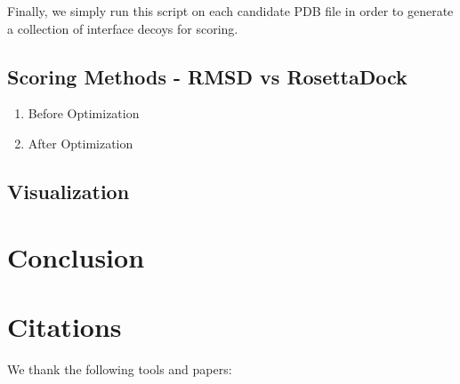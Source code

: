 \documentclass{article}
\begin{document}
Finally, we simply run this script on each candidate PDB file in order to generate a collection of interface decoys for scoring.


\subsection{Scoring Methods - RMSD vs RosettaDock}

\begin{enumerate}

\item Before Optimization



\item After Optimization



\end{enumerate}

\subsection{Visualization}



\section{Conclusion}



\section{Citations}

We thank the following tools and papers: \\\\
\end{document}
